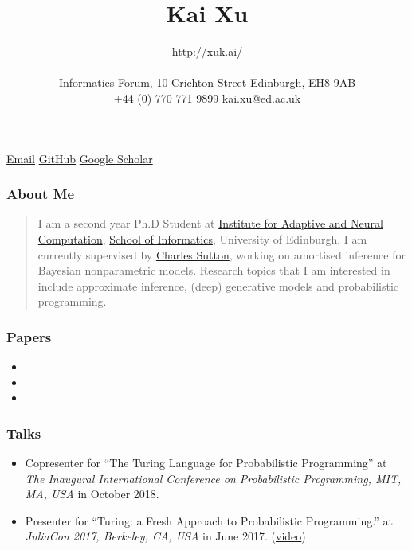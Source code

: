\documentclass[11pt, a4paper]{article}
\title{Kai Xu} %
\date{} %
\author{http://xuk.ai/\\\\
Informatics Forum, 10 Crichton Street \textbar{} Edinburgh, EH8 9AB\\ %
+44 (0) 770 771 9899 \textbar{} kai.xu@ed.ac.uk } %
\providecommand{\tightlist}{%
  \setlength{\itemsep}{0pt}\setlength{\parskip}{0pt}}
\begin{document}

\maketitle
\begin{raggedright}
\href{mailto:kai.xu@ed.ac.uk}{Email} \textbar{}
\href{http://github.com/xukai92}{GitHub} \textbar{}
\href{https://scholar.google.ca/citations?user=kf3C60wAAAAJ}{Google
Scholar}

\subsubsection{About Me}

\begin{quote}
I am a second year Ph.D Student at
\href{http://www.anc.ed.ac.uk/}{Institute for Adaptive and Neural
Computation}, \href{https://www.ed.ac.uk/informatics}{School of
Informatics}, University of Edinburgh. I am currently supervised by
\href{http://homepages.inf.ed.ac.uk/csutton/}{Charles Sutton}, working
on amortised inference for Bayesian nonparametric models. Research
topics that I am interested in include approximate inference, (deep)
generative models and probabilistic programming.
\end{quote}

\subsubsection{Papers}

\begin{itemize}
\item
\item
\item
\end{itemize}

\subsubsection{Talks}

\begin{itemize}
\tightlist
\item
  Copresenter for ``The Turing Language for Probabilistic Programming''
  at \emph{The Inaugural International Conference on Probabilistic
  Programming, MIT, MA, USA} in October 2018.
\item
  Presenter for ``Turing: a Fresh Approach to Probabilistic
  Programming.'' at \emph{JuliaCon 2017, Berkeley, CA, USA} in June
  2017. (\href{https://www.youtube.com/watch?v=DJWNQg7uuCg}{video})
\end{itemize}


\end{raggedright}
\end{document}
